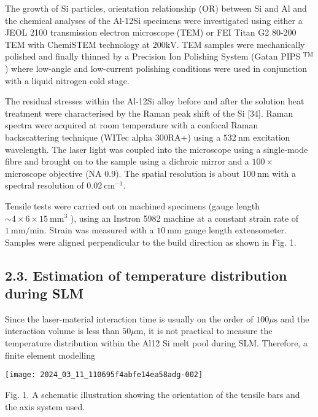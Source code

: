 \documentclass[10pt]{article}
\begin{document}
The growth of $\mathrm{Si}$ particles, orientation relationship (OR) between $\mathrm{Si}$ and $\mathrm{Al}$ and the chemical analyses of the Al-12Si specimens were investigated using either a JEOL 2100 transmission electron microscope (TEM) or FEI Titan G2 80-200 TEM with ChemiSTEM technology at $200 \mathrm{kV}$. TEM samples were mechanically polished and finally thinned by a Precision Ion Polishing System (Gatan PIPS ${ }^{\mathrm{TM}}$ ) where low-angle and low-current polishing conditions were used in conjunction with a liquid nitrogen cold stage.

The residual stresses within the Al-12Si alloy before and after the solution heat treatment were characterised by the Raman peak shift of the Si [34]. Raman spectra were acquired at room temperature with a confocal Raman backscattering technique (WITec alpha 300RA+) using a $532 \mathrm{~nm}$ excitation wavelength. The laser light was coupled into the microscope using a single-mode fibre and brought on to the sample using a dichroic mirror and a $100 \times$ microscope objective (NA 0.9). The spatial resolution is about $100 \mathrm{~nm}$ with a spectral resolution of $0.02 \mathrm{~cm}^{-1}$.

Tensile tests were carried out on machined specimens (gauge length $\sim 4 \times 6 \times 15 \mathrm{~mm}^{3}$ ), using an Instron 5982 machine at a constant strain rate of $1 \mathrm{~mm} / \mathrm{min}$. Strain was measured with a $10 \mathrm{~mm}$ gauge length extensometer. Samples were aligned perpendicular to the build direction as shown in Fig. 1.

\subsection*{2.3. Estimation of temperature distribution during SLM}
Since the laser-material interaction time is usually on the order of $100 \mu \mathrm{s}$ and the interaction volume is less than $50 \mu \mathrm{m}$, it is not practical to measure the temperature distribution within the Al12 Si melt pool during SLM. Therefore, a finite element modelling

\begin{center}
\texttt{[image: 2024\_03\_11\_110695f4abfe14ea58adg-002]}
\end{center}

Fig. 1. A schematic illustration showing the orientation of the tensile bars and the axis system used.
\end{document}
